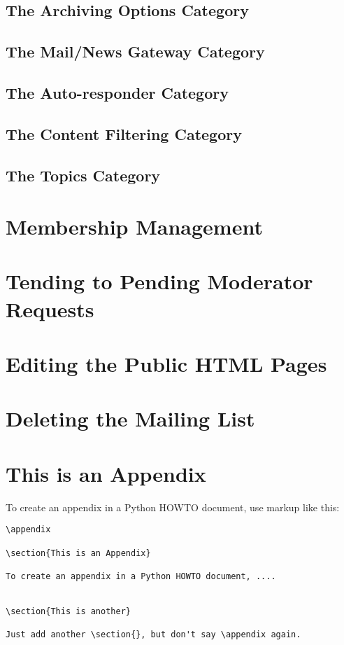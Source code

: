 \documentclass{howto}
\begin{document}
\subsection{The Archiving Options Category}
\subsection{The Mail/News Gateway Category}
\subsection{The Auto-responder Category}
\subsection{The Content Filtering Category}
\subsection{The Topics Category}

\section{Membership Management}
\section{Tending to Pending Moderator Requests}
\section{Editing the Public HTML Pages}
\section{Deleting the Mailing List}

\appendix

\section{This is an Appendix}

To create an appendix in a Python HOWTO document, use markup like
this:

\begin{verbatim}
\appendix

\section{This is an Appendix}

To create an appendix in a Python HOWTO document, ....


\section{This is another}

Just add another \section{}, but don't say \appendix again.
\end{verbatim}
\end{document}
